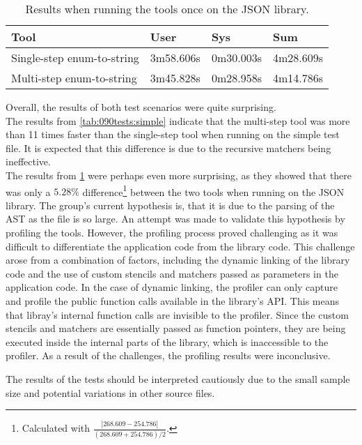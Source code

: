 \begin{table}[H]
    \centering
    \begin{tabular}{|p{}|p{}|p{}|p{}|}
    \hline
    \rowcolor{gray!30}
    \textbf{Tool} & \textbf{User} & \textbf{Sys} & \textbf{Sum} \\ \hline
    Single-step enum-to-string & 3m58.606s & 0m30.003s & 4m28.609s \\ \hline
    Multi-step enum-to-string & 3m45.828s & 0m28.958s & 4m14.786s\\ \hline
    \end{tabular}
    \caption{Results when running the tools once on the JSON library.}
    \label{tab:090tests:json}
\end{table}
\vspace*{-1em}

Overall, the results of both test scenarios were quite surprising.\\
The results from \cref{tab:090tests:simple} indicate that the multi-step tool was more than 11 times faster than the single-step tool when running on the simple test file. It is expected that this difference is due to the recursive matchers being ineffective.\\
The results from \cref{tab:090tests:json} were perhaps even more surprising, as they showed that there was only a $5.28\%$ difference\footnote{
    Calculated with $\frac{|268.609-254.786|}{(268.609+254.786)/2}$.
} between the two tools when running on the JSON library.
The group's current hypothesis is, that it is due to the parsing of the AST as the file is so large.
An attempt was made to validate this hypothesis by profiling the tools. However, the profiling process proved challenging as it was difficult to differentiate the application code from the library code.
This challenge arose from a combination of factors, including the dynamic linking of the library code and the use of custom stencils and matchers passed as parameters in the application code.
In the case of dynamic linking, the profiler can only capture and profile the public function calls available in the library's API.
This means that libray's internal function calls are invisible to the profiler.
Since the custom stencils and matchers are essentially passed as function pointers, they are being executed inside the internal parts of the library, which is inaccessible to the profiler.
As a result of the challenges, the profiling results were inconclusive. 

The results of the tests should be interpreted cautiously due to the small sample size and potential variations in other source files.

